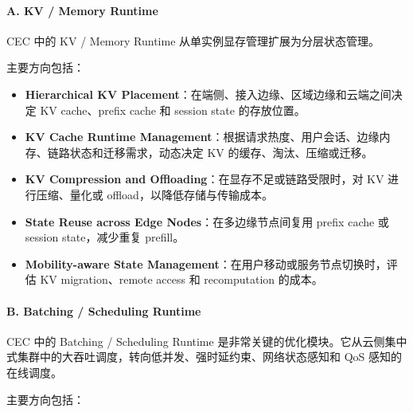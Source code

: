 \documentclass[a4paper,10pt]{ctexart}
\begin{document}
\paragraph*{A. KV / Memory Runtime}



CEC 中的 KV / Memory Runtime 从单实例显存管理扩展为分层状态管理。




主要方向包括：




\begin{itemize}
\item \textbf{Hierarchical KV Placement}：在端侧、接入边缘、区域边缘和云端之间决定 KV cache、prefix cache 和 session state 的存放位置。

\item \textbf{KV Cache Runtime Management}：根据请求热度、用户会话、边缘内存、链路状态和迁移需求，动态决定 KV 的缓存、淘汰、压缩或迁移。

\item \textbf{KV Compression and Offloading}：在显存不足或链路受限时，对 KV 进行压缩、量化或 offload，以降低存储与传输成本。

\item \textbf{State Reuse across Edge Nodes}：在多边缘节点间复用 prefix cache 或 session state，减少重复 prefill。

\item \textbf{Mobility-aware State Management}：在用户移动或服务节点切换时，评估 KV migration、remote access 和 recomputation 的成本。



\end{itemize}
\paragraph*{B. Batching / Scheduling Runtime}



CEC 中的 Batching / Scheduling Runtime 是非常关键的优化模块。它从云侧集中式集群中的大吞吐调度，转向低并发、强时延约束、网络状态感知和 QoS 感知的在线调度。




主要方向包括：
\end{document}
